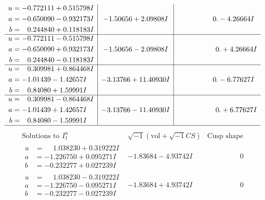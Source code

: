 \documentclass[1p]{elsarticle_modified}
\theoremstyle{definition}
\newcommand{\I}{\sqrt{-1}}
\begin{document}
$$\begin{array}{c|c|c}
\begin{aligned}
u &= -0.772111 + 0.515798 I \\
a &= -0.650090 - 0.932173 I \\
b &= \phantom{-}0.244840 + 0.118183 I\end{aligned}
 & -1.50656 + 2.09808 I & \phantom{-0.000000 } 0. - 4.26664 I \\ \hline\begin{aligned}
u &= -0.772111 - 0.515798 I \\
a &= -0.650090 + 0.932173 I \\
b &= \phantom{-}0.244840 - 0.118183 I\end{aligned}
 & -1.50656 - 2.09808 I & \phantom{-0.000000 -}0. + 4.26664 I \\ \hline\begin{aligned}
u &= \phantom{-}0.309981 + 0.864468 I \\
a &= -1.01439 - 1.42657 I \\
b &= \phantom{-}0.84080 + 1.59991 I\end{aligned}
 & -3.13766 + 11.40930 I & \phantom{-0.000000 } 0. - 6.77627 I \\ \hline\begin{aligned}
u &= \phantom{-}0.309981 - 0.864468 I \\
a &= -1.01439 + 1.42657 I \\
b &= \phantom{-}0.84080 - 1.59991 I\end{aligned}
 & -3.13766 - 11.40930 I & \phantom{-0.000000 -}0. + 6.77627 I\\
 \hline 
 \end{array}$$\newpage$$\begin{array}{c|c|c}  
\text{Solutions to }I^u_{1}& \I (\text{vol} + \sqrt{-1}CS) & \text{Cusp shape}\\
 \hline 
\begin{aligned}
u &= \phantom{-}1.038230 + 0.319222 I \\
a &= -1.226750 + 0.095271 I \\
b &= -0.232277 + 0.027239 I\end{aligned}
 & -1.83684 - 4.93742 I & \phantom{-0.000000 } 0 \\ \hline\begin{aligned}
u &= \phantom{-}1.038230 - 0.319222 I \\
a &= -1.226750 - 0.095271 I \\
b &= -0.232277 - 0.027239 I\end{aligned}
 & -1.83684 + 4.93742 I & \phantom{-0.000000 } 0 \\ \hline\begin{aligned}

\end{aligned}
\end{array}$$
\end{document}
